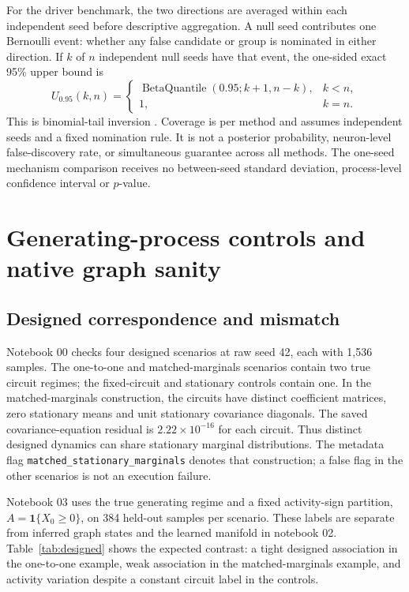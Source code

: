 \documentclass[11pt,a4paper]{article}
\begin{document}
For the driver benchmark, the two directions are averaged within each independent
seed before descriptive aggregation. A null seed contributes one Bernoulli event:
whether any false candidate or group is nominated in either direction. If $k$ of
$n$ independent null seeds have that event, the one-sided exact 95\% upper bound is
\begin{equation}
 U_{0.95}(k,n)=
 \begin{cases}
  \operatorname{BetaQuantile}(0.95;k+1,n-k), & k<n,\\
  1, & k=n.
 \end{cases}
 \label{eq:nullbound}
\end{equation}
This is binomial-tail inversion \citep{clopper1934confidence}. Coverage is per
method and assumes independent seeds and a fixed nomination rule. It is not a
posterior probability, neuron-level false-discovery rate, or simultaneous
guarantee across all methods. The one-seed mechanism comparison receives no
between-seed standard deviation, process-level confidence interval or $p$-value.

\section{Generating-process controls and native graph sanity}
\label{sec:controls}

\subsection{Designed correspondence and mismatch}

Notebook 00 checks four designed scenarios at raw seed 42, each with 1,536 samples.
The one-to-one and matched-marginals scenarios contain two true circuit regimes;
the fixed-circuit and stationary controls contain one. In the matched-marginals
construction, the circuits have distinct coefficient matrices, zero stationary
means and unit stationary covariance diagonals. The saved covariance-equation
residual is $2.22\times10^{-16}$ for each circuit. Thus distinct designed dynamics
can share stationary marginal distributions. The metadata flag
\texttt{matched\_stationary\_marginals} denotes that construction; a false flag in
the other scenarios is not an execution failure.

Notebook 03 uses the true generating regime and a fixed activity-sign partition,
$A=\mathbf{1}\{X_0\geq0\}$, on 384 held-out samples per scenario. These labels are
separate from inferred graph states and the learned manifold in notebook 02.
Table~\ref{tab:designed} shows the expected contrast: a tight designed association
in the one-to-one example, weak association in the matched-marginals example, and
activity variation despite a constant circuit label in the controls.
\end{document}
